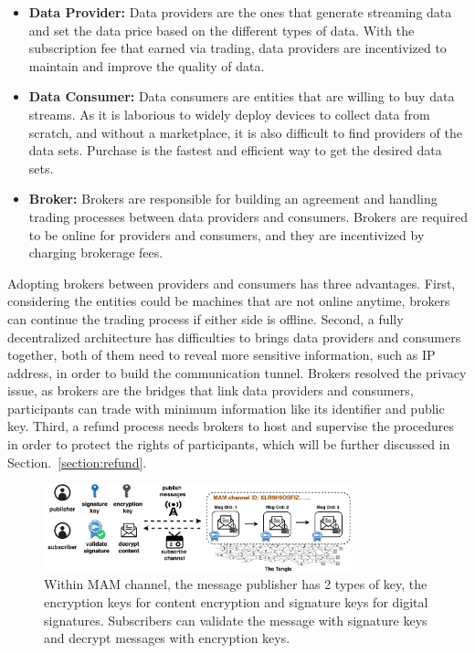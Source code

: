 \documentclass[10pt, conference, compsocconf]{IEEEtran}
\begin{document}
\begin{itemize}
\item \textbf{Data Provider: }
Data providers are the ones that generate streaming data and set the data price based on the different types of data. With the subscription fee that earned via trading, data providers are incentivized to maintain and improve the quality of data.
\item \textbf{Data Consumer: }
Data consumers are entities that are willing to buy data streams. As it is laborious to widely deploy devices to collect data from scratch, and without a marketplace, it is also difficult to find providers of the data sets. Purchase is the fastest and efficient way to get the desired data sets.
\item \textbf{Broker: }
Brokers are responsible for building an agreement and handling trading processes between data providers and consumers. Brokers are required to be online for providers and consumers, and they are incentivized by charging brokerage fees.
\end{itemize}

Adopting brokers between providers and consumers has three advantages. First, considering the entities could be machines that are not online anytime, brokers can continue the trading process if either side is offline. Second, a fully decentralized architecture has difficulties to brings data providers and consumers together, both of them need to reveal more sensitive information, such as IP address, in order to build the communication tunnel. Brokers resolved the privacy issue, as brokers are the bridges that link data providers and consumers, participants can trade with minimum information like its identifier and public key. Third, a refund process needs brokers to host and supervise the procedures in order to protect the rights of participants, which will be further discussed in Section.~\ref{section:refund}.

\begin{figure}[h]
    \centering
    \includegraphics[width=3.5in]{channel_and_key_fold}
    \caption{Within MAM channel, the message publisher has 2 types of key, the encryption keys for content encryption and signature keys for digital signatures. Subscribers can validate the message with signature keys and decrypt messages with encryption keys.}
    \label{fig:channel_and_key}
\end{figure}
\end{document}
